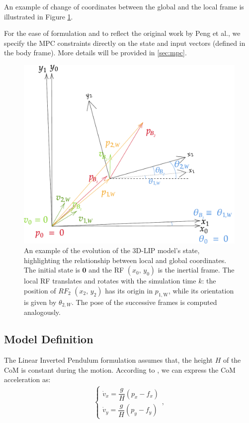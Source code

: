 An example of change of coordinates between the global and the local frame is illustrated in Figure \ref{fig:loc_to_glob_tfm}.

For the ease of formulation and to reflect the original work by Peng et al., we specify the MPC constraints directly on the state and input vectors (defined in the body frame). More details will be provided in \ref{sec:mpc}.

\begin{figure}[h]
    \centering
    \includegraphics[width=0.75\linewidth]{figures/LIP/loc_to_glob_tfm3.pdf}
    \caption{An example of the evolution of the 3D-LIP model's state, highlighting the relationship between local and global coordinates. The initial state is $\mathbf{0}$ and the RF $(x_0,\, y_0)$ is the inertial frame. The local RF translates and rotates with the simulation time $k$: the position of $RF_2$ $(x_2,\, y_2)$ has its origin in $p_{1, \text{W}}$, while its orientation is given by $\theta_{2, W}$. The pose of the successive frames is computed analogously.}
    \label{fig:loc_to_glob_tfm}
\end{figure}

\subsection{Model Definition}
The Linear Inverted Pendulum formulation assumes that, the height $H$ of the CoM is constant during the motion.
According to \cite{peng_main_paper}, we can express the CoM acceleration as:
\begin{align}
    \begin{cases}
        \dot{v}_{x} = \dfrac{g}{H}(p_{x} - f_{x})
        \\[1ex]
        \dot{v}_{y} = \dfrac{g}{H}(p_{y} - f_{y})
    \end{cases},
\end{align}


